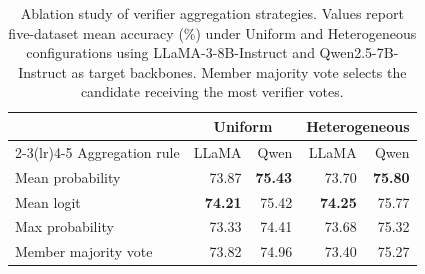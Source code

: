 \begin{table}[!b]
\centering\small
\setlength{\tabcolsep}{3pt}
\begin{tabular}{lrrrr}
\toprule
& \multicolumn{2}{c}{\textbf{Uniform}} & \multicolumn{2}{c}{\textbf{Heterogeneous}} \\
\cmidrule(lr){2-3}\cmidrule(lr){4-5}
Aggregation rule & LLaMA & Qwen & LLaMA & Qwen \\
\midrule
Mean probability & 73.87 & \textbf{75.43} & 73.70 & \textbf{75.80} \\
Mean logit & \textbf{74.21} & 75.42 & \textbf{74.25} & 75.77 \\
Max probability & 73.33 & 74.41 & 73.68 & 75.32 \\
Member majority vote & 73.82 & 74.96 & 73.40 & 75.27 \\
\bottomrule
\end{tabular}
\caption{Ablation study of verifier aggregation strategies. Values report five-dataset mean accuracy (\%) under Uniform and Heterogeneous configurations using LLaMA-3-8B-Instruct and Qwen2.5-7B-Instruct as target backbones. Member majority vote selects the candidate receiving the most verifier votes.}
\label{tab:ablation}
\end{table}